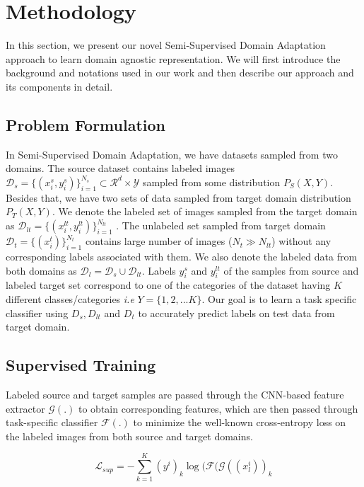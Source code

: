 \section{Methodology}


In this section, we present our novel Semi-Supervised Domain Adaptation approach to learn domain agnostic representation. We will first introduce the background and notations used in our work and then describe our approach and its components in detail.

\subsection{Problem Formulation }
In Semi-Supervised Domain Adaptation, we have datasets sampled from two domains. The source dataset contains labeled images $\mathcal{D}_s =\{(x_i^s, y_i^s)\}_{i=1}^{N_s} \subset \mathcal{R}^d \times \mathcal{Y}$ sampled from some distribution $P_S(X,Y)$. Besides that, we have two sets of data  sampled from target domain distribution $P_T(X,Y)$. We denote the labeled set of images sampled from the target domain as $\mathcal{D}_{lt} =\{(x_i^{lt}, y_i^{lt})\}_{i=1}^{N_{lt}}$ . The unlabeled set sampled from target domain $\mathcal{D}_t =\{(x_i^t)\}_{i=1}^{N_t}$ contains large number of images ($N_t \gg N_{lt}$) without any corresponding labels associated with them. We also denote the labeled data from both domains as $\mathcal{D}_l= \mathcal{D}_s \cup \mathcal{D}_{lt}$. Labels $y_i^s$ and $y_i^{lt}$ of the samples from source and labeled target set correspond to one of the categories of the dataset having $K$ different classes/categories \textit{i.e} $Y=\{1,2,...K\}$. Our goal is to learn a task specific classifier  using $D_s,D_{lt}$ and $D_t$ to accurately predict labels on test data from target domain. 

\subsection{Supervised Training}
Labeled source and target samples are passed through the CNN-based feature extractor $\mathcal{G}(.)$ to obtain corresponding features, which are then passed through task-specific classifier $\mathcal{F}(.)$ to minimize the well-known cross-entropy loss on the labeled images from both source and target domains.

\vspace{-2mm}
\begin{equation}
\label{eq:sup_loss}
\mathcal{L}_{sup} = -\sum\limits_{k=1}^{K}(y^i)_k \log(\mathcal{F}(\mathcal{G}((x^i_l))_k
\end{equation}

